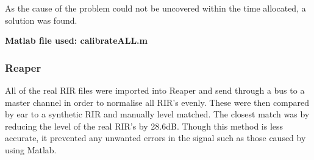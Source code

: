 \documentclass[../../main.tex]{subfiles}
\begin{document}
		As the cause of the problem could not be uncovered within the time allocated, a solution was found.

		\textbf{Matlab file used: calibrateALL.m}

		\subsubsection{Reaper}

			All of the real \ac{RIR} files were imported into Reaper and send through a bus to a master channel in order to normalise all \ac{RIR}'s evenly. These were then compared by ear to a synthetic \ac{RIR} and manually level matched. The closest match was by reducing the level of the real \ac{RIR}'s by 28.6dB. Though this method is less accurate, it prevented any unwanted errors in the signal such as those caused by using Matlab.

	
\end{document}
